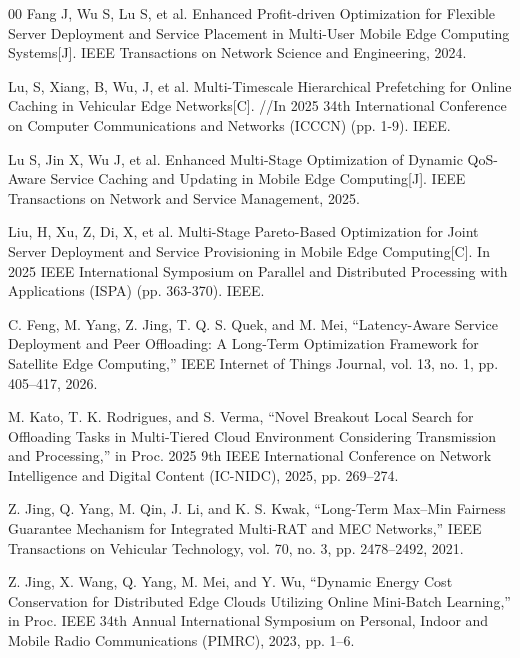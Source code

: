 \documentclass[10pt, conference, letterpaper]{IEEEtran}
\begin{document}
\begin{thebibliography}{00}
 Fang J, Wu S, Lu S, et al. Enhanced Profit-driven Optimization for Flexible Server Deployment and Service Placement in Multi-User Mobile Edge Computing Systems[J]. IEEE Transactions on Network Science and Engineering, 2024.

 Lu, S, Xiang, B, Wu, J, et al. Multi-Timescale Hierarchical Prefetching for Online Caching in Vehicular Edge Networks[C]. //In 2025 34th International Conference on Computer Communications and Networks (ICCCN) (pp. 1-9). IEEE.

 Lu S, Jin X, Wu J, et al. Enhanced Multi-Stage Optimization of Dynamic QoS-Aware Service Caching and Updating in Mobile Edge Computing[J]. IEEE Transactions on Network and Service Management, 2025.

 Liu, H, Xu, Z, Di, X, et al. Multi-Stage Pareto-Based Optimization for Joint Server Deployment and Service Provisioning in Mobile Edge Computing[C]. In 2025 IEEE International Symposium on Parallel and Distributed Processing with Applications (ISPA) (pp. 363-370). IEEE.

 C. Feng, M. Yang, Z. Jing, T. Q. S. Quek, and M. Mei, ``Latency-Aware Service Deployment and Peer Offloading: A Long-Term Optimization Framework for Satellite Edge Computing,'' IEEE Internet of Things Journal, vol. 13, no. 1, pp. 405--417, 2026.

 M. Kato, T. K. Rodrigues, and S. Verma, ``Novel Breakout Local Search for Offloading Tasks in Multi-Tiered Cloud Environment Considering Transmission and Processing,'' in Proc. 2025 9th IEEE International Conference on Network Intelligence and Digital Content (IC-NIDC), 2025, pp. 269--274.

 Z. Jing, Q. Yang, M. Qin, J. Li, and K. S. Kwak, ``Long-Term Max--Min Fairness Guarantee Mechanism for Integrated Multi-RAT and MEC Networks,'' IEEE Transactions on Vehicular Technology, vol. 70, no. 3, pp. 2478--2492, 2021.

 Z. Jing, X. Wang, Q. Yang, M. Mei, and Y. Wu, ``Dynamic Energy Cost Conservation for Distributed Edge Clouds Utilizing Online Mini-Batch Learning,'' in Proc. IEEE 34th Annual International Symposium on Personal, Indoor and Mobile Radio Communications (PIMRC), 2023, pp. 1--6.


\end{thebibliography}
\end{document}

